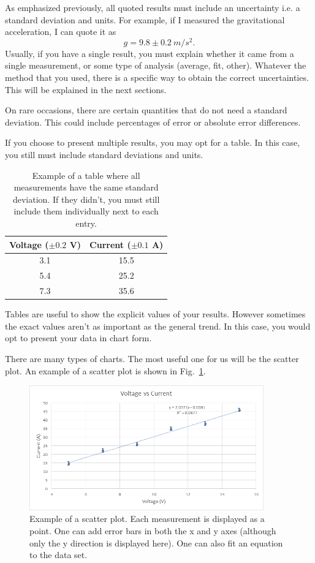 \documentclass[12pt]{report}
\begin{document}
As emphasized previously, all quoted results must include an uncertainty i.e. a standard deviation and units. For example, if I measured the gravitational acceleration, I can quote it as
\begin{equation}
g = 9.8 \pm 0.2 \ m/s^2.
\end{equation}
Usually, if you have a single result, you must explain whether it came from a single measurement, or some type of analysis (average, fit, other).
Whatever the method that you used, there is a specific way to obtain the correct uncertainties. This will be explained in the next sections.

On rare occasions, there are certain quantities that do not need a standard deviation. This could include percentages of error or absolute error differences.

If you choose to present multiple results, you may opt for a table. In this case, you still must include standard deviations and units.
\begin{table}[h]
\centering
\begin{tabular}{||c|c||}
\hline
Voltage ($\pm 0.2$ V) & Current ($\pm 0.1$ A) \\ \hline
3.1 & 15.5 \\
5.4 & 25.2 \\
7.3 & 35.6 \\ \hline
\end{tabular}
\caption{Example of a table where all measurements have the same standard deviation. If they didn't, you must still include them individually next to each entry.}
\label{Table:Presentation-Example}
\end{table}

Tables are useful to show the explicit values of your results. However sometimes the exact values aren't as important as the general trend. In this case, you would opt to present your data in chart form.

There are many types of charts. The most useful one for us will be the scatter plot. An example of a scatter plot is shown in Fig.~\ref{Fig:Example-Scatter}.
\begin{figure}[h]
\centering
\includegraphics[width=0.9\textwidth]{intro-example-scatter}
\caption{Example of a scatter plot. Each measurement is displayed as a point. One can add error bars in both the x and y axes (although only the y direction is displayed here). One can also fit an equation to the data set.}
\label{Fig:Example-Scatter}
\end{figure}
\end{document}
